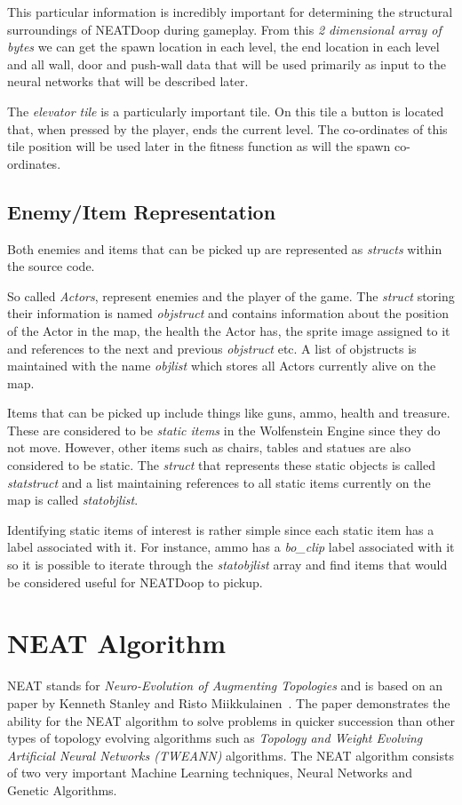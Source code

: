 \documentclass[]{Learning-to-Play-Wolfenstein-thesis}
\begin{document}
This particular information is incredibly important for determining the structural surroundings of NEATDoop during gameplay. From this \textit{2 dimensional array of bytes} we can get the spawn location in each level, the end location in each level and all wall, door and push-wall data that will be used primarily as input to the neural networks that will be described later. 

The \textit{elevator tile} is a particularly important tile. On this tile a button is located that, when pressed by the player, ends the current level. The co-ordinates of this tile position will be used later in the fitness function as will the spawn co-ordinates. 

\subsection{Enemy/Item Representation}
Both enemies and items that can be picked up are represented as \textit{structs} within the source code. 

So called \textit{Actors}, represent enemies and the player of the game. The \textit{struct} storing their information is named \textit{objstruct} and contains information about the position of the Actor in the map, the health the Actor has, the sprite image assigned to it and references to the next and previous \textit{objstruct} etc. A list of objstructs is maintained with the name \textit{objlist} which stores all Actors currently alive on the map.

Items that can be picked up include things like guns, ammo, health and treasure. These are considered to be \textit{static items} in the Wolfenstein Engine since they do not move. However, other items such as chairs, tables and statues are also considered to be static. The \textit{struct} that represents these static objects is called \textit{statstruct} and a list maintaining references to all static items currently on the map is called \textit{statobjlist}.

Identifying static items of interest is rather simple since each static item has a label associated with it. For instance, ammo has a \textit{bo\_clip} label associated with it so it is possible to iterate through the \textit{statobjlist} array and find items that would be considered useful for NEATDoop to pickup. 
\newpage
\section{NEAT Algorithm}
NEAT stands for \textit{Neuro-Evolution of Augmenting Topologies} and is based on an paper by Kenneth Stanley and Risto Miikkulainen~\cite{NEAT:2002}. The paper demonstrates the ability for the NEAT algorithm to solve problems in quicker succession than other types of topology evolving algorithms such as \textit{Topology and Weight Evolving Artificial Neural Networks (TWEANN)} algorithms. The NEAT algorithm consists of two very important Machine Learning techniques, Neural Networks and Genetic Algorithms.\\\\
\end{document}
